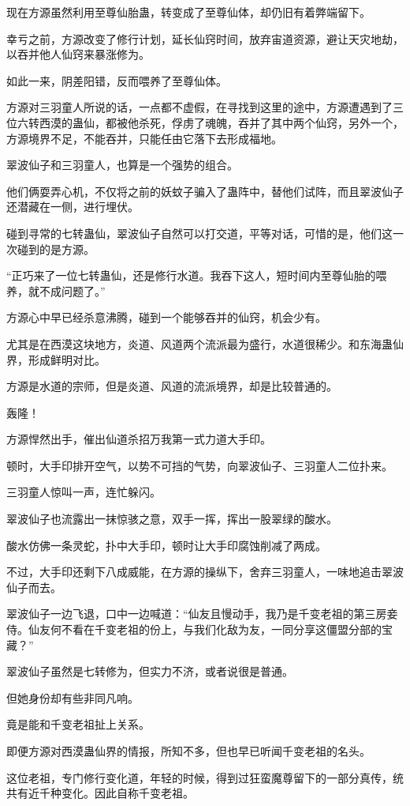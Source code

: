 \begin{this_body}
现在方源虽然利用至尊仙胎蛊，转变成了至尊仙体，却仍旧有着弊端留下。

幸亏之前，方源改变了修行计划，延长仙窍时间，放弃宙道资源，避让天灾地劫，以吞并他人仙窍来暴涨修为。

如此一来，阴差阳错，反而喂养了至尊仙体。

方源对三羽童人所说的话，一点都不虚假，在寻找到这里的途中，方源遭遇到了三位六转西漠的蛊仙，都被他杀死，俘虏了魂魄，吞并了其中两个仙窍，另外一个，方源境界不足，不能吞并，只能任由它落下去形成福地。

翠波仙子和三羽童人，也算是一个强势的组合。

他们俩耍弄心机，不仅将之前的妖蚊子骗入了蛊阵中，替他们试阵，而且翠波仙子还潜藏在一侧，进行埋伏。

碰到寻常的七转蛊仙，翠波仙子自然可以打交道，平等对话，可惜的是，他们这一次碰到的是方源。

“正巧来了一位七转蛊仙，还是修行水道。我吞下这人，短时间内至尊仙胎的喂养，就不成问题了。”

方源心中早已经杀意沸腾，碰到一个能够吞并的仙窍，机会少有。

尤其是在西漠这块地方，炎道、风道两个流派最为盛行，水道很稀少。和东海蛊仙界，形成鲜明对比。

方源是水道的宗师，但是炎道、风道的流派境界，却是比较普通的。

轰隆！

方源悍然出手，催出仙道杀招万我第一式力道大手印。

顿时，大手印排开空气，以势不可挡的气势，向翠波仙子、三羽童人二位扑来。

三羽童人惊叫一声，连忙躲闪。

翠波仙子也流露出一抹惊骇之意，双手一挥，挥出一股翠绿的酸水。

酸水仿佛一条灵蛇，扑中大手印，顿时让大手印腐蚀削减了两成。

不过，大手印还剩下八成威能，在方源的操纵下，舍弃三羽童人，一味地追击翠波仙子而去。

翠波仙子一边飞退，口中一边喊道：“仙友且慢动手，我乃是千变老祖的第三房妾侍。仙友何不看在千变老祖的份上，与我们化敌为友，一同分享这僵盟分部的宝藏？”

翠波仙子虽然是七转修为，但实力不济，或者说很是普通。

但她身份却有些非同凡响。

竟是能和千变老祖扯上关系。

即便方源对西漠蛊仙界的情报，所知不多，但也早已听闻千变老祖的名头。

这位老祖，专门修行变化道，年轻的时候，得到过狂蛮魔尊留下的一部分真传，统共有近千种变化。因此自称千变老祖。


\end{this_body}
